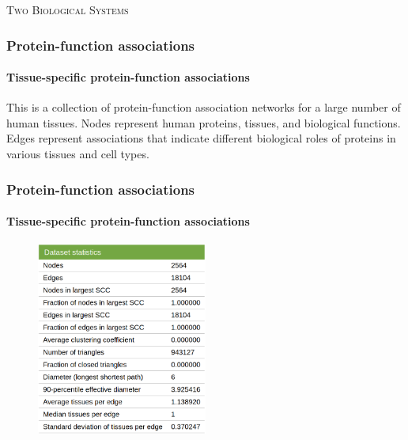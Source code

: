 \documentclass[aspectratio=43,leqno]{beamer}
\begin{document}
\begin{frame}
  \vfill
\begin{center}
  \textsc{Two Biological Systems}
\end{center}
  \vfill
\end{frame}

\begin{frame}
  \frametitle{Protein-function associations}
  \framesubtitle{Tissue-specific protein-function associations}

  This is a collection of protein-function association networks for a large number of human tissues. Nodes represent human proteins, tissues, and biological functions. Edges represent associations that indicate different biological roles of proteins in various tissues and cell types.

\end{frame}

\begin{frame}
  \frametitle{Protein-function associations}
  \framesubtitle{Tissue-specific protein-function associations}

    \begin{figure}[h]
    \centering
    \includegraphics[width=0.5\textwidth]{images/tfg.png}
    \label{fig:mesh1}
  \end{figure}
  
\end{frame}
\end{document}
